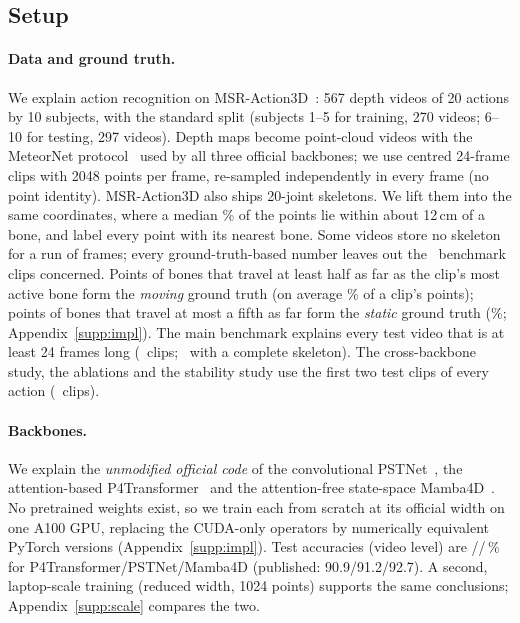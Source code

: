 \subsection{Setup}
\label{sec:exp-setup}
\paragraph{Data and ground truth.}
We explain action recognition on MSR-Action3D~\cite{li2010msraction3d}: 567 depth videos of 20 actions by 10 subjects, with the standard split (subjects 1--5 for training, 270 videos; 6--10 for testing, 297 videos). Depth maps become point-cloud videos with the MeteorNet protocol~\cite{liu2019meteornet} used by all three official backbones; we use centred 24-frame clips with 2048 points per frame, re-sampled independently in every frame (no point identity). MSR-Action3D also ships 20-joint skeletons. We lift them into the same coordinates, where a median \NumGTFitMedian\% of the points lie within about 12\,cm of a bone, and label every point with its nearest bone. Some videos store no skeleton for a run of frames; every ground-truth-based number leaves out the \NumGTMissing\ benchmark clips concerned. Points of bones that travel at least half as far as the clip's most active bone form the \emph{moving} ground truth (on average \NumGTMovingPct\% of a clip's points); points of bones that travel at most a fifth as far form the \emph{static} ground truth (\NumGTStaticPct\%; Appendix~\ref{supp:impl}). The main benchmark explains every test video that is at least 24 frames long (\NumPFTClips\ clips; \NumGTValid\ with a complete skeleton). The cross-backbone study, the ablations and the stability study use the first two test clips of every action (\NumCrossClips\ clips).

\paragraph{Backbones.}
We explain the \emph{unmodified official code} of the convolutional PSTNet~\cite{fan2021pstnet}, the attention-based P4Transformer~\cite{fan2021p4transformer} and the attention-free state-space Mamba4D~\cite{liu2025mamba4d}. No pretrained weights exist, so we train each from scratch at its official width on one A100 GPU, replacing the CUDA-only operators by numerically equivalent PyTorch versions (Appendix~\ref{supp:impl}). Test accuracies (video level) are \BBaccPFT/\BBaccPST/\BBaccMBA\,\% for P4Transformer/PSTNet/Mamba4D (published: 90.9/91.2/92.7). A second, laptop-scale training (reduced width, 1024 points) supports the same conclusions; Appendix~\ref{supp:scale} compares the two.

